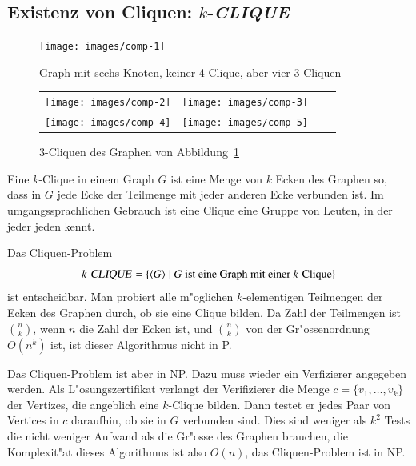 \subsection{Existenz von Cliquen: \texorpdfstring{$k$}{k}-\textsl{CLIQUE}}
\begin{figure}
\begin{center}
\texttt{[image: images/comp-1]}
\end{center}
\caption{Graph mit sechs Knoten, keiner 4-Clique, aber
vier 3-Cliquen\label{6graph}}
\end{figure}%
\begin{figure}
\begin{center}
\begin{tabular}{cccc}
\texttt{[image: images/comp-2]}&%
\texttt{[image: images/comp-3]}\\
\texttt{[image: images/comp-4]}&%
\texttt{[image: images/comp-5]}
\end{tabular}
\end{center}
\caption{3-Cliquen des Graphen von Abbildung~\ref{6graph}}
\end{figure}%
Eine $k$-Clique in einem Graph $G$ ist eine Menge von $k$
Ecken des Graphen so, dass in $G$ jede Ecke der Teilmenge mit
jeder anderen Ecke verbunden ist. Im umgangssprachlichen Gebrauch
ist eine Clique eine Gruppe von Leuten, in der jeder jeden kennt.

Das Cliquen-Problem
\[
\text{$k$-\textsl{CLIQUE}} = \{ \langle G\rangle\;|\;
\text{$G$ ist eine Graph mit einer $k$-Clique}\}
\]
ist entscheidbar. Man probiert alle m"oglichen $k$-elementigen
Teilmengen der Ecken des Graphen durch, ob sie eine Clique
bilden. Da Zahl der Teilmengen ist $\binom{n}{k}$, wenn $n$
die Zahl der Ecken ist, und $\binom{n}{k}$ von der Gr"ossenordnung
$O(n^k)$ ist, ist dieser Algorithmus nicht in P.

Das Cliquen-Problem ist aber in NP. Dazu muss wieder ein
Verfizierer angegeben werden. Als L"osungszertifikat verlangt
der Verifizierer die Menge $c=\{v_1,\dots,v_k\}$ der
Vertizes, die angeblich eine $k$-Clique bilden. Dann testet
er jedes Paar von Vertices in $c$ daraufhin, ob sie in $G$
verbunden sind. Dies sind weniger als $k^2$ Tests die nicht
weniger Aufwand als die Gr"osse des Graphen brauchen, die
Komplexit"at dieses Algorithmus ist also $O(n)$, das
Cliquen-Problem ist in NP.


